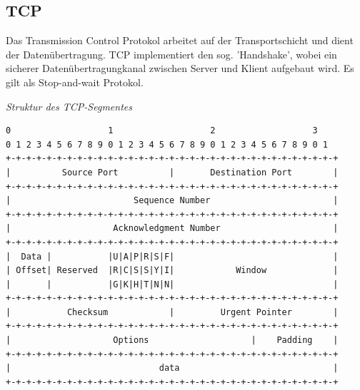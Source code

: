 \documentclass{article}
\begin{document}
    \subsection{TCP}
    Das Transmission Control Protokol arbeitet auf der Transportschicht und dient der Datenübertragung. TCP implementiert den sog. 'Handshake', wobei ein sicherer Datenübertragungkanal zwischen Server und Klient aufgebaut wird. Es gilt als Stop-and-wait Protokol.
    
    \textit{Struktur des TCP-Segmentes}
    \begin{verbatim}
0                   1                   2                   3
0 1 2 3 4 5 6 7 8 9 0 1 2 3 4 5 6 7 8 9 0 1 2 3 4 5 6 7 8 9 0 1
+-+-+-+-+-+-+-+-+-+-+-+-+-+-+-+-+-+-+-+-+-+-+-+-+-+-+-+-+-+-+-+-+
|          Source Port          |       Destination Port        |
+-+-+-+-+-+-+-+-+-+-+-+-+-+-+-+-+-+-+-+-+-+-+-+-+-+-+-+-+-+-+-+-+
|                        Sequence Number                        |
+-+-+-+-+-+-+-+-+-+-+-+-+-+-+-+-+-+-+-+-+-+-+-+-+-+-+-+-+-+-+-+-+
|                    Acknowledgment Number                      |
+-+-+-+-+-+-+-+-+-+-+-+-+-+-+-+-+-+-+-+-+-+-+-+-+-+-+-+-+-+-+-+-+
|  Data |           |U|A|P|R|S|F|                               |
| Offset| Reserved  |R|C|S|S|Y|I|            Window             |
|       |           |G|K|H|T|N|N|                               |
+-+-+-+-+-+-+-+-+-+-+-+-+-+-+-+-+-+-+-+-+-+-+-+-+-+-+-+-+-+-+-+-+
|           Checksum            |         Urgent Pointer        |
+-+-+-+-+-+-+-+-+-+-+-+-+-+-+-+-+-+-+-+-+-+-+-+-+-+-+-+-+-+-+-+-+
|                    Options                    |    Padding    |
+-+-+-+-+-+-+-+-+-+-+-+-+-+-+-+-+-+-+-+-+-+-+-+-+-+-+-+-+-+-+-+-+
|                             data                              |
+-+-+-+-+-+-+-+-+-+-+-+-+-+-+-+-+-+-+-+-+-+-+-+-+-+-+-+-+-+-+-+-+        
    \end{verbatim}
    
\end{document}
